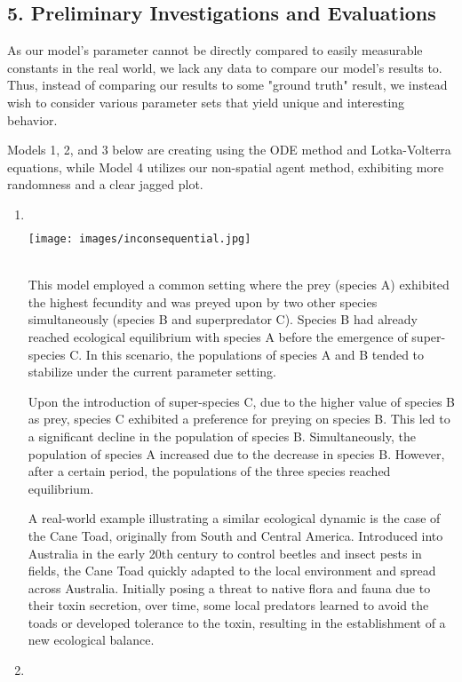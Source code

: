 \documentclass{article}
\begin{document}
\subsection*{5. Preliminary Investigations and Evaluations}
As our model's parameter cannot be directly compared to easily measurable constants in the real world, we lack any data to compare our model's results to. Thus, instead of comparing our results to some "ground truth" result, we instead wish to  consider various parameter sets that yield unique and interesting behavior.\par
Models 1, 2, and 3 below are creating using the ODE method and Lotka-Volterra equations, while Model 4 utilizes our non-spatial agent method, exhibiting more randomness and a clear jagged plot.\begin{enumerate}
    \item${}$\\
    \centerline{\texttt{[image: images/inconsequential.jpg]}}\\
    This model employed a common setting where the prey (species A) exhibited the highest fecundity and was preyed upon by two other species simultaneously (species B and superpredator C). Species B had already reached ecological equilibrium with species A before the emergence of super-species C. In this scenario, the populations of species A and B tended to stabilize under the current parameter setting.\par
    Upon the introduction of super-species C, due to the higher value of species B as prey, species C exhibited a preference for preying on species B. This led to a significant decline in the population of species B. Simultaneously, the population of species A increased due to the decrease in species B. However, after a certain period, the populations of the three species reached equilibrium.\par
    A real-world example illustrating a similar ecological dynamic is the case of the Cane Toad, originally from South and Central America. Introduced into Australia in the early 20th century to control beetles and insect pests in fields, the Cane Toad quickly adapted to the local environment and spread across Australia. \cite{Invasive_toads} Initially posing a threat to native flora and fauna due to their toxin secretion, over time, some local predators learned to avoid the toads or developed tolerance to the toxin, resulting in the establishment of a new ecological balance.
    \item${}$\\

\end{enumerate}
\end{document}
